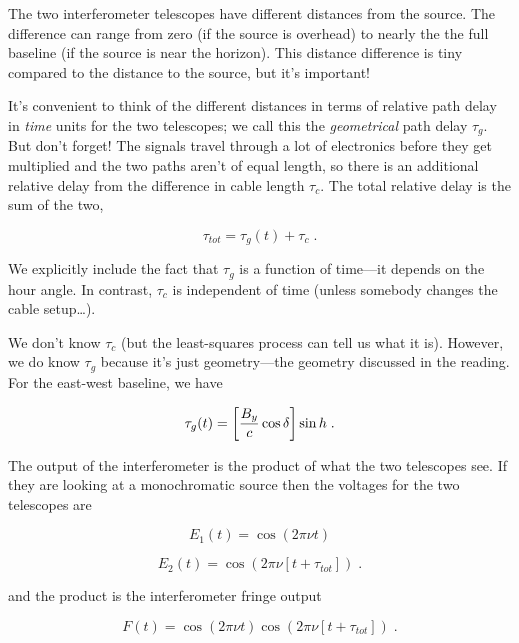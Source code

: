 \documentclass[11pt,preprint]{aastex}
\begin{document}
	The two interferometer telescopes have different distances from
the source. The difference can range from zero (if the source is
overhead) to nearly the the full baseline (if the source is near the
horizon). This distance difference is tiny compared to the distance to
the source, but it's important! 

	It's convenient to think of the different distances in terms of 
relative path delay in {\it time} units for the two telescopes; we call
this the {\it geometrical} path delay $\tau_g$.  But don't forget! The
signals travel through a lot of electronics before they get multiplied
and the two paths aren't of equal length, so there is an additional
relative delay from the difference in cable length $\tau_c$.  The total
relative delay is the sum of the two,

\begin{equation}
 \tau_{tot} = \tau_g(t) + \tau_c \; . 
\end{equation}


\noindent We explicitly include the fact that $\tau_g$ is a function of
time---it depends on the hour angle. In contrast, $\tau_c$ is
independent of time (unless somebody changes the cable setup\dots).

	We don't know $\tau_c$ (but the least-squares process can tell
us what it is).  However, we do know $\tau_g$ because it's just
geometry---the geometry discussed in the reading.  For the east-west
baseline, we have

\begin{equation}
 \tau_g(t) = \left[{B_y \over c} \cos \delta \right] \sin h \; . 
\end{equation}


	The output of the interferometer is the product of what the two
telescopes see. If they are looking at a monochromatic source then the
voltages for the two telescopes are

\begin{equation}
 E_1(t) = \cos (2 \pi \nu t) 
\end{equation}


\begin{equation}
 E_2(t) = \cos (2 \pi \nu [t + \tau_{tot}]) \; . 
\end{equation}


\noindent and the product is the interferometer fringe output

\begin{equation}
 F(t) = \cos (2 \pi \nu t) \cos (2 \pi \nu [t + \tau_{tot}]) \; . 
\end{equation}
\end{document}
